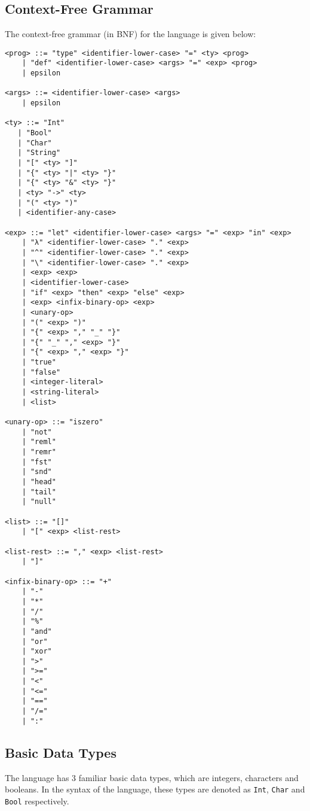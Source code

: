 \documentclass{article}
\begin{document}
\subsection{Context-Free Grammar}
The context-free grammar (in BNF) for the language is given below:
\begin{verbatim}
<prog> ::= "type" <identifier-lower-case> "=" <ty> <prog>
    | "def" <identifier-lower-case> <args> "=" <exp> <prog>
    | epsilon

<args> ::= <identifier-lower-case> <args>
    | epsilon

<ty> ::= "Int"
   | "Bool"
   | "Char"
   | "String"
   | "[" <ty> "]"
   | "{" <ty> "|" <ty> "}"
   | "{" <ty> "&" <ty> "}"
   | <ty> "->" <ty>
   | "(" <ty> ")"
   | <identifier-any-case>

<exp> ::= "let" <identifier-lower-case> <args> "=" <exp> "in" <exp>
    | "λ" <identifier-lower-case> "." <exp>
    | "^" <identifier-lower-case> "." <exp>
    | "\" <identifier-lower-case> "." <exp>
    | <exp> <exp>
    | <identifier-lower-case>
    | "if" <exp> "then" <exp> "else" <exp>
    | <exp> <infix-binary-op> <exp>
    | <unary-op>
    | "(" <exp> ")"
    | "{" <exp> "," "_" "}"
    | "{" "_" "," <exp> "}"
    | "{" <exp> "," <exp> "}"
    | "true"
    | "false"
    | <integer-literal>
    | <string-literal>
    | <list>

<unary-op> ::= "iszero"
    | "not"
    | "reml"
    | "remr"
    | "fst"
    | "snd"
    | "head"
    | "tail"
    | "null"

<list> ::= "[]"
    | "[" <exp> <list-rest>

<list-rest> ::= "," <exp> <list-rest>
    | "]"

<infix-binary-op> ::= "+"
    | "-"
    | "*"
    | "/"
    | "%"
    | "and"
    | "or"
    | "xor"
    | ">"
    | ">="
    | "<"
    | "<="
    | "=="
    | "/="
    | ":"
\end{verbatim}

\subsection{Basic Data Types}
The language has 3 familiar basic data types, which are integers, characters and booleans. In the syntax of the language, these types are denoted as \texttt{Int}, \texttt{Char} and \texttt{Bool} respectively.
\end{document}
